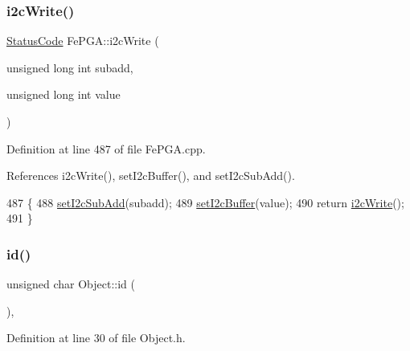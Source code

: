 \mbox{\label{classFePGA_a45e1cfdf1f303f3958bf6a83c4e8039b}} 
\subsubsection{\texorpdfstring{i2c\+Write()}{i2cWrite()}\hspace{0.1cm}{\footnotesize\ttfamily [2/2]}}
{\footnotesize\ttfamily \hyperlink{classStatusCode}{Status\+Code} Fe\+P\+G\+A\+::i2c\+Write (\begin{DoxyParamCaption}\item[{unsigned long int}]{subadd,  }\item[{unsigned long int}]{value }\end{DoxyParamCaption})}



Definition at line 487 of file Fe\+P\+G\+A.\+cpp.



References i2c\+Write(), set\+I2c\+Buffer(), and set\+I2c\+Sub\+Add().


\begin{DoxyCode}
487                                                                            \{
488   \hyperlink{classFePGA_a37c1ee5bf89667c641f321479697166f}{setI2cSubAdd}(subadd);
489   \hyperlink{classFePGA_aaf52ed549f6b79d53f49c3f85c5fbad2}{setI2cBuffer}(value);
490   \textcolor{keywordflow}{return} \hyperlink{classFePGA_a27b9c9bb486cea35b1bbcac5da96f527}{i2cWrite}();
491 \}
\end{DoxyCode}
\mbox{\label{classObject_af99145335cc61ff6e2798ea17db009d2}} 
\subsubsection{\texorpdfstring{id()}{id()}}
{\footnotesize\ttfamily unsigned char Object\+::id (\begin{DoxyParamCaption}{ }\end{DoxyParamCaption})\hspace{0.3cm}{\ttfamily [inline]}, {\ttfamily [inherited]}}



Definition at line 30 of file Object.\+h.



